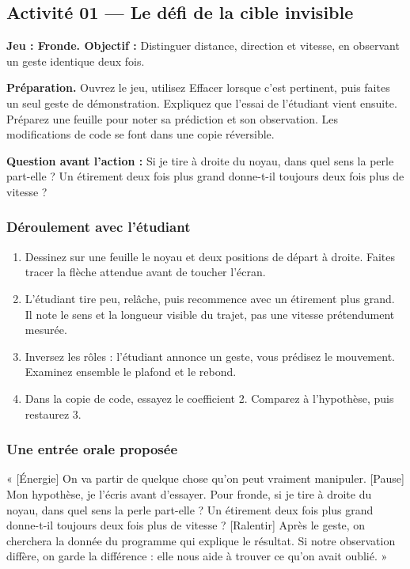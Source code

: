 \documentclass[
  canadien,
  11pt,
  letterpaper,
]{article}
\providecommand{\tightlist}{%
  \setlength{\itemsep}{0pt}\setlength{\parskip}{0pt}}
\begin{document}
\subsection{Activité 01 --- Le défi de la cible
invisible}\label{activituxe9-01-le-duxe9fi-de-la-cible-invisible}

\textbf{Jeu : Fronde. Objectif :} Distinguer distance, direction et
vitesse, en observant un geste identique deux fois.

\textbf{Préparation.} Ouvrez le jeu, utilisez Effacer lorsque c'est
pertinent, puis faites un seul geste de démonstration. Expliquez que
l'essai de l'étudiant vient ensuite. Préparez une feuille pour noter sa
prédiction et son observation. Les modifications de code se font dans
une copie réversible.

\textbf{Question avant l'action :} Si je tire à droite du noyau, dans
quel sens la perle part-elle ? Un étirement deux fois plus grand
donne-t-il toujours deux fois plus de vitesse ?

\subsubsection{Déroulement avec
l'étudiant}\label{duxe9roulement-avec-luxe9tudiant}

\begin{enumerate}
\def\labelenumi{\arabic{enumi}.}
\tightlist
\item
  Dessinez sur une feuille le noyau et deux positions de départ à
  droite. Faites tracer la flèche attendue avant de toucher l'écran.
\item
  L'étudiant tire peu, relâche, puis recommence avec un étirement plus
  grand. Il note le sens et la longueur visible du trajet, pas une
  vitesse prétendument mesurée.
\item
  Inversez les rôles : l'étudiant annonce un geste, vous prédisez le
  mouvement. Examinez ensemble le plafond et le rebond.
\item
  Dans la copie de code, essayez le coefficient 2. Comparez à
  l'hypothèse, puis restaurez 3.
\end{enumerate}

\subsubsection{Une entrée orale
proposée}\label{une-entruxe9e-orale-proposuxe9e}

« {[}Énergie{]} On va partir de quelque chose qu'on peut vraiment
manipuler. {[}Pause{]} Mon hypothèse, je l'écris avant d'essayer. Pour
fronde, si je tire à droite du noyau, dans quel sens la perle part-elle
? Un étirement deux fois plus grand donne-t-il toujours deux fois plus
de vitesse ? {[}Ralentir{]} Après le geste, on cherchera la donnée du
programme qui explique le résultat. Si notre observation diffère, on
garde la différence : elle nous aide à trouver ce qu'on avait oublié. »
\end{document}
